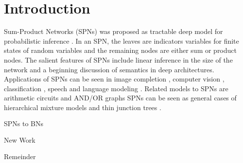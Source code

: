 \section{Introduction}

Sum-Product Networks (SPNs) was proposed as tractable deep model for probabilistic inference \cite{poon2011sum}.
In an SPN, the leaves are indicators variables for finite states of random variables and the remaining nodes are either sum or product nodes. 
The salient features of SPNs include linear inference in the size of the network and a beginning discussion of semantics in deep architectures.
Applications of SPNs can be seen in image completion \cite{poon2011sum,dennis2012learning,peharz2013greedy}, computer vision \cite{amer2012sum}, classification \cite{gens2012discriminative}, speech and language modeling \cite{peharz2014modeling,cheng2014language,zohrer2015representation}.
Related models to SPNs are arithmetic circuits \cite{darwiche2003differential} and AND/OR graphs \cite{dechter2007and}
SPNs can be seen as general cases of hierarchical mixture models \cite{zhang2004hierarchical} and thin junction trees \cite{chechetka2008efficient}.


SPNs to BNs

New Work

Remeinder

